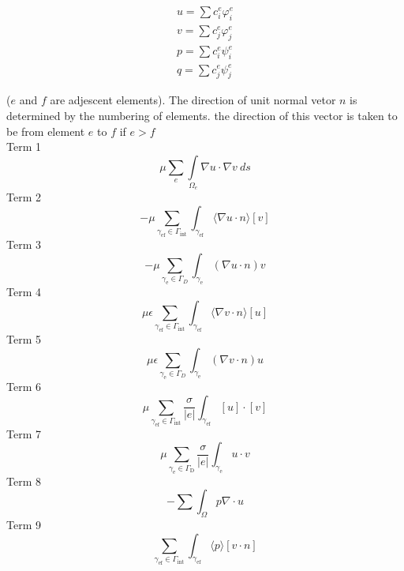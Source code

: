 \documentclass[11pt,a4paper]{article}
\begin{document}
\begin{eqnarray*}
u=\sum c^e_i \varphi^e_i\\ 
v=\sum c^e_j \varphi^e_j\\
p=\sum c^e_i \psi^e_i\\
q=\sum c^e_j \psi^e_j
\end{eqnarray*}

($e$ and $f$ are adjescent elements). The direction of unit normal vetor $n$ is determined by the numbering of elements. 
the direction of this vector is taken to be from element $e$ to $f$ if $e>f$ \\

Term 1
\begin{equation*}
\mu \sum\limits_{e} \int\limits_{\Omega_e} \nabla u \cdot \nabla v~ds
\end{equation*}
Term 2
\begin{equation*}
- \mu \sum\limits_{\gamma_{\text{ef}} \in \Gamma_{\text{int}}} \int_{\gamma_{\text{ef}}}\langle
\nabla u \cdot n \rangle [v]
\end{equation*}
Term 3
\begin{equation*}
- \mu \sum\limits_{\gamma_{\text{e}} \in \Gamma_{D}}\int_{\gamma_{\text{e}}}  (\nabla u \cdot  n)  v
\end{equation*}
Term 4
\begin{equation*}
\mu {\epsilon} \sum\limits_{\gamma_{\text{ef}} \in \Gamma_{\text{int}}} \int_{\gamma_{\text{ef}}} \langle \nabla v
\cdot n \rangle [u]
\end{equation*}
Term 5
\begin{equation*}
\mu {\epsilon} \sum\limits_{\gamma_{\text{e}} \in \Gamma_{D}}\int_{\gamma_{\text{e}}} (\nabla v \cdot n) u
\end{equation*}
Term 6
\begin{equation*}
\mu {\sum\limits_{\gamma_{\text{ef}} \in \Gamma_{\text{int}}} \frac{\sigma}{|{e}|}\int_{\gamma_{\text{ef}}} [u] \cdot [v]}
\end{equation*}
Term 7
\begin{equation*}
\mu {\sum\limits_{\gamma_{\text{e}} \in \Gamma_{\text{D}}} \frac{\sigma}{|{e}|}\int_{\gamma_{\text{e}}} u \cdot v}
\end{equation*}
Term 8
\begin{equation*}
- \sum \int_\Omega p \nabla \cdot u 
\end{equation*}
\newpage
Term 9
\begin{equation*}
\sum\limits_{\gamma_{\text{ef}} \in \Gamma_{\text{int}}} \int_{\gamma_{\text{ef}}}
\langle p \rangle [v \cdot n]
\end{equation*}
\end{document}
